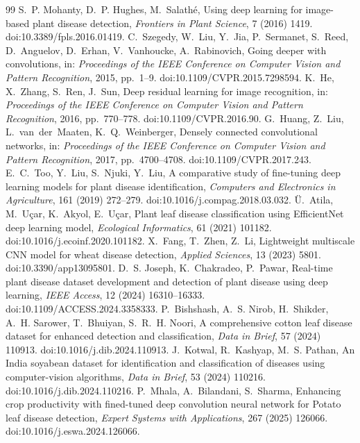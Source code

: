 \documentclass[a4paper,fleqn]{cas-dc}
\begin{document}
\begin{thebibliography}{99}
 S.~P. Mohanty, D.~P. Hughes, M.~Salathé, Using deep learning for image-based plant disease detection, \textit{Frontiers in Plant Science}, 7 (2016) 1419. doi:10.3389/fpls.2016.01419.
 C.~Szegedy, W.~Liu, Y.~Jia, P.~Sermanet, S.~Reed, D.~Anguelov, D.~Erhan, V.~Vanhoucke, A.~Rabinovich, Going deeper with convolutions, in: \textit{Proceedings of the IEEE Conference on Computer Vision and Pattern Recognition}, 2015, pp.~1--9. doi:10.1109/CVPR.2015.7298594.
 K.~He, X.~Zhang, S.~Ren, J.~Sun, Deep residual learning for image recognition, in: \textit{Proceedings of the IEEE Conference on Computer Vision and Pattern Recognition}, 2016, pp.~770--778. doi:10.1109/CVPR.2016.90.
 G.~Huang, Z.~Liu, L.~van~der~Maaten, K.~Q.~Weinberger, Densely connected convolutional networks, in: \textit{Proceedings of the IEEE Conference on Computer Vision and Pattern Recognition}, 2017, pp.~4700--4708. doi:10.1109/CVPR.2017.243.
 E.~C.~Too, Y.~Liu, S.~Njuki, Y.~Liu, A comparative study of fine-tuning deep learning models for plant disease identification, \textit{Computers and Electronics in Agriculture}, 161 (2019) 272--279. doi:10.1016/j.compag.2018.03.032.
 Ü.~Atila, M.~Uçar, K.~Akyol, E.~Uçar, Plant leaf disease classification using EfficientNet deep learning model, \textit{Ecological Informatics}, 61 (2021) 101182. doi:10.1016/j.ecoinf.2020.101182.
 X.~Fang, T.~Zhen, Z.~Li, Lightweight multiscale CNN model for wheat disease detection, \textit{Applied Sciences}, 13 (2023) 5801. doi:10.3390/app13095801.
 D.~S. Joseph, K.~Chakradeo, P.~Pawar, Real-time plant disease dataset development and detection of plant disease using deep learning, \textit{IEEE Access}, 12 (2024) 16310--16333. doi:10.1109/ACCESS.2024.3358333.
 P.~Bishshash, A.~S. Nirob, H.~Shikder, A.~H. Sarower, T.~Bhuiyan, S.~R.~H. Noori, A comprehensive cotton leaf disease dataset for enhanced detection and classification, \textit{Data in Brief}, 57 (2024) 110913. doi:10.1016/j.dib.2024.110913.
 J.~Kotwal, R.~Kashyap, M.~S. Pathan, An India soyabean dataset for identification and classification of diseases using computer-vision algorithms, \textit{Data in Brief}, 53 (2024) 110216. doi:10.1016/j.dib.2024.110216.
 P.~Mhala, A.~Bilandani, S.~Sharma, Enhancing crop productivity with fined-tuned deep convolution neural network for Potato leaf disease detection, \textit{Expert Systems with Applications}, 267 (2025) 126066. doi:10.1016/j.eswa.2024.126066.
\end{thebibliography}
\end{document}

